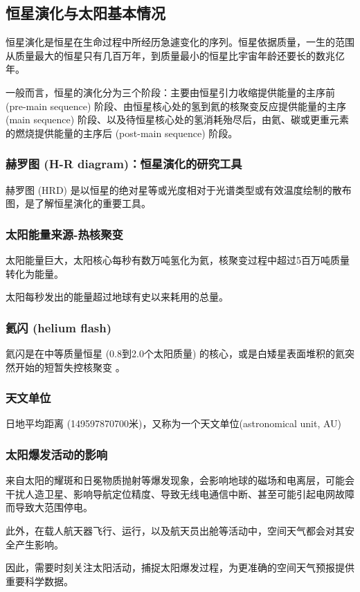 \documentclass[12pt,a4paper]{article}
\begin{document}
	\subsection{恒星演化与太阳基本情况}
	
	恒星演化是恒星在生命过程中所经历急遽变化的序列。恒星依据质量，一生的范围从质量最大的恒星只有几百万年，到质量最小的恒星比宇宙年龄还要长的数兆亿年。
	
	一般而言，恒星的演化分为三个阶段：主要由恒星引力收缩提供能量的主序前 (pre-main sequence) 阶段、由恒星核心处的氢到氦的核聚变反应提供能量的主序 (main sequence) 阶段、以及待恒星核心处的氢消耗殆尽后，由氦、碳或更重元素的燃烧提供能量的主序后 (post-main sequence) 阶段。
	
	\subsubsection{赫罗图 (H-R diagram)：恒星演化的研究工具}
	赫罗图 (HRD) 是以恒星的绝对星等或光度相对于光谱类型或有效温度绘制的散布图，是了解恒星演化的重要工具。
	\subsubsection{太阳能量来源-热核聚变}
	太阳能量巨大，太阳核心每秒有数万吨氢化为氦，核聚变过程中超过5百万吨质量转化为能量。
	
	太阳每秒发出的能量超过地球有史以来耗用的总量。
	\subsubsection{氦闪 (helium flash)}
	氦闪是在中等质量恒星 (0.8到2.0个太阳质量) 的核心，或是白矮星表面堆积的氦突然开始的短暂失控核聚变 。
	\subsubsection{天文单位}
	日地平均距离 (149597870700米)，又称为一个天文单位(astronomical unit, AU)
	
	\subsubsection{太阳爆发活动的影响}
	来自太阳的耀斑和日冕物质抛射等爆发现象，会影响地球的磁场和电离层，可能会干扰人造卫星、影响导航定位精度、导致无线电通信中断、甚至可能引起电网故障而导致大范围停电。
	
	此外，在载人航天器飞行、运行，以及航天员出舱等活动中，空间天气都会对其安全产生影响。
	
	因此，需要时刻关注太阳活动，捕捉太阳爆发过程，为更准确的空间天气预报提供重要科学数据。
	
\end{document}
